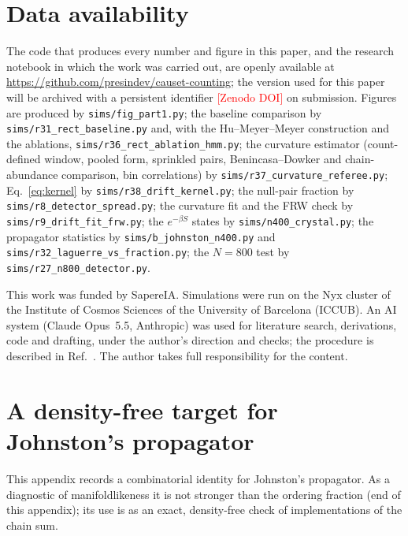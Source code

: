 \documentclass[prd,twocolumn,superscriptaddress,nofootinbib,amsmath,amssymb,floatfix]{revtex4-2}
\newcommand{\pending}[1]{\textcolor{red}{[#1]}}
\begin{document}
\section*{Data availability}
The code that produces every number and figure in this paper, and the research notebook in which the work was carried out, are openly available at \url{https://github.com/presindev/causet-counting}; the version used for this paper will be archived with a persistent identifier \pending{Zenodo DOI} on submission. Figures are produced by \texttt{sims/fig\_part1.py}; the baseline comparison by \texttt{sims/r31\_rect\_baseline.py} and, with the Hu--Meyer--Meyer construction and the ablations, \texttt{sims/r36\_rect\_ablation\_hmm.py}; the curvature estimator (count-defined window, pooled form, sprinkled pairs, Benincasa--Dowker and chain-abundance comparison, bin correlations) by \texttt{sims/r37\_curvature\_referee.py}; Eq.~\eqref{eq:kernel} by \texttt{sims/r38\_drift\_kernel.py}; the null-pair fraction by \texttt{sims/r8\_detector\_spread.py}; the curvature fit and the FRW check by \texttt{sims/r9\_drift\_fit\_frw.py}; the $e^{-\beta S}$ states by \texttt{sims/n400\_crystal.py}; the propagator statistics by \texttt{sims/b\_johnston\_n400.py} and \texttt{sims/r32\_laguerre\_vs\_fraction.py}; the $N=800$ test by \texttt{sims/r27\_n800\_detector.py}.

\begin{acknowledgments}
This work was funded by SapereIA. Simulations were run on the Nyx cluster of the Institute of Cosmos Sciences of the University of Barcelona (ICCUB). An AI system (Claude Opus~5.5, Anthropic) was used for literature search, derivations, code and drafting, under the author's direction and checks; the procedure is described in Ref.~\cite{MethodNote}. The author takes full responsibility for the content.
\end{acknowledgments}

\appendix
\section{A density-free target for Johnston's propagator}\label{app:prop}
This appendix records a combinatorial identity for Johnston's propagator. As a diagnostic of manifoldlikeness it is not stronger than the ordering fraction (end of this appendix); its use is as an exact, density-free check of implementations of the chain sum.
\end{document}
